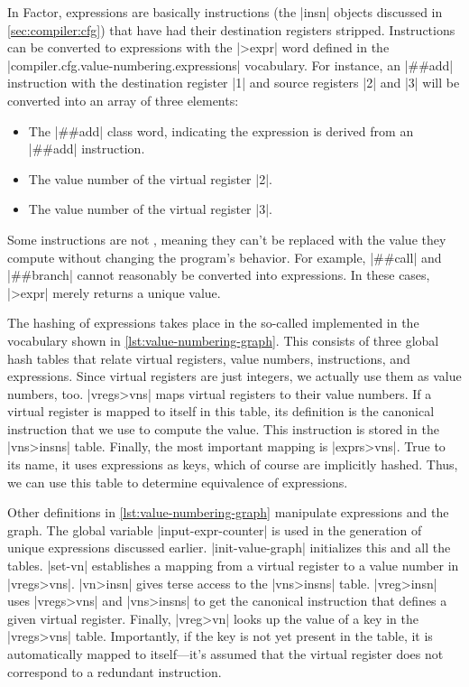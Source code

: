 In Factor, expressions are basically instructions (the \factor|insn| objects
discussed in \cref{sec:compiler:cfg}) that have had their destination registers
stripped.  Instructions can be converted to expressions with the \factor|>expr|
word defined in the \factor|compiler.cfg.value-numbering.expressions|
vocabulary.  For instance, an \factor|##add| instruction with the destination
register \factor|1| and source registers \factor|2| and \factor|3| will be
converted into an array of three elements:
%
\begin{itemize}
%
  \item The \factor|##add| class word, indicating the expression is derived
        from an \factor|##add| instruction.
%
  \item The value number of the virtual register \factor|2|.
%
  \item The value number of the virtual register \factor|3|.
%
\end{itemize}
%
\noindent Some instructions are not , meaning
they can't be replaced with the value they compute without changing the
program's behavior.  For example, \factor|##call| and \factor|##branch| cannot
reasonably be converted into expressions.  In these cases, \factor|>expr|
merely returns a unique value.


The hashing of expressions takes place in the so-called 
implemented in the vocabulary shown in \vref{lst:value-numbering-graph}.  This
consists of three global hash tables that relate virtual registers, value
numbers, instructions, and expressions.  Since virtual registers are just
integers, we actually use them as value numbers, too.  \factor|vregs>vns| maps
virtual registers to their value numbers.  If a virtual register  is mapped to
itself in this table, its definition is the canonical instruction that we use
to compute the value.  This instruction is stored in the \factor|vns>insns|
table.  Finally, the most important mapping is \factor|exprs>vns|.  True to its
name, it uses expressions as keys, which of course are implicitly hashed.
Thus, we can use this table to determine equivalence of expressions.

Other definitions in \vref{lst:value-numbering-graph} manipulate expressions
and the graph.  The global variable \factor|input-expr-counter| is used in the
generation of unique expressions discussed earlier.  \factor|init-value-graph|
initializes this and all the tables.  \factor|set-vn| establishes a mapping
from a virtual register to a value number in \factor|vregs>vns|.
\factor|vn>insn| gives terse access to the \factor|vns>insns| table.
\factor|vreg>insn| uses \factor|vregs>vns| and \factor|vns>insns| to get the
canonical instruction that defines a given virtual register.  Finally,
\factor|vreg>vn| looks up the value of a key in the \factor|vregs>vns| table.
Importantly, if the key is not yet present in the table, it is automatically
mapped to itself---it's assumed that the virtual register does not correspond
to a redundant instruction.

